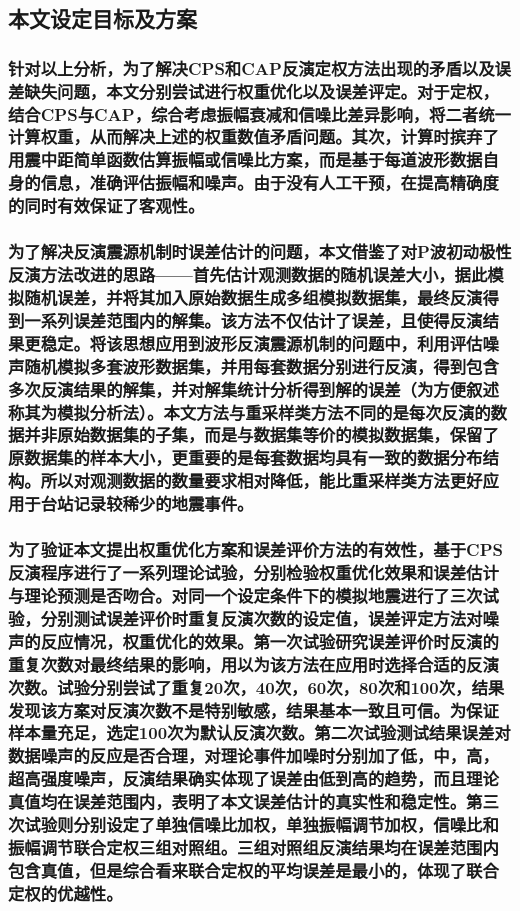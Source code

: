 \documentclass[a4paper,12pt,single,pdftex]{scrartcl}
\begin{document}
\label{ID_616390154}\subsection{本文设定目标及方案}

\label{ID_1218200436}\subsubsection{针对以上分析，为了解决CPS和CAP反演定权方法出现的矛盾以及误差缺失问题，本文分别尝试进行权重优化以及误差评定。对于定权，结合CPS与CAP，综合考虑振幅衰减和信噪比差异影响，将二者统一计算权重，从而解决上述的权重数值矛盾问题。其次，计算时摈弃了用震中距简单函数估算振幅或信噪比方案，而是基于每道波形数据自身的信息，准确评估振幅和噪声。由于没有人工干预，在提高精确度的同时有效保证了客观性。}

\label{ID_1099326584}\subsubsection{为了解决反演震源机制时误差估计的问题，本文借鉴了\citet{Hardebeck2002}对P波初动极性反演方法改进的思路——首先估计观测数据的随机误差大小，据此模拟随机误差，并将其加入原始数据生成多组模拟数据集，最终反演得到一系列误差范围内的解集。该方法不仅估计了误差，且使得反演结果更稳定\citep{Hardebeck2002}。将该思想应用到波形反演震源机制的问题中，利用评估噪声随机模拟多套波形数据集，并用每套数据分别进行反演，得到包含多次反演结果的解集，并对解集统计分析得到解的误差（为方便叙述称其为模拟分析法）。本文方法与重采样类方法\citep{郑建常2015,Efron1979}不同的是每次反演的数据并非原始数据集的子集，而是与数据集等价的模拟数据集，保留了原数据集的样本大小，更重要的是每套数据均具有一致的数据分布结构。所以对观测数据的数量要求相对降低，能比重采样类方法更好应用于台站记录较稀少的地震事件。}

\label{ID_323720947}\subsubsection{为了验证本文提出权重优化方案和误差评价方法的有效性，基于CPS反演程序进行了一系列理论试验，分别检验权重优化效果和误差估计与理论预测是否吻合。对同一个设定条件下的模拟地震进行了三次试验，分别测试误差评价时重复反演次数的设定值，误差评定方法对噪声的反应情况，权重优化的效果。第一次试验研究误差评价时反演的重复次数对最终结果的影响，用以为该方法在应用时选择合适的反演次数。试验分别尝试了重复20次，40次，60次，80次和100次，结果发现该方案对反演次数不是特别敏感，结果基本一致且可信。为保证样本量充足，选定100次为默认反演次数。第二次试验测试结果误差对数据噪声的反应是否合理，对理论事件加噪时分别加了低，中，高，超高强度噪声，反演结果确实体现了误差由低到高的趋势，而且理论真值均在误差范围内，表明了本文误差估计的真实性和稳定性。第三次试验则分别设定了单独信噪比加权，单独振幅调节加权，信噪比和振幅调节联合定权三组对照组。三组对照组反演结果均在误差范围内包含真值，但是综合看来联合定权的平均误差是最小的，体现了联合定权的优越性。}
\end{document}
